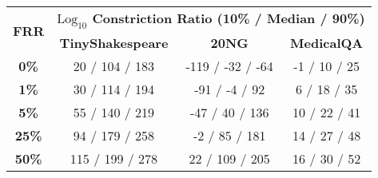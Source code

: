 \begin{tabular}{c c c c}
\toprule
\multirow{2}{*}{\textbf{FRR }} & \multicolumn{3}{c}{\textbf{$\text{Log}_{10}$ Constriction Ratio (10\% / Median / 90\%)}} \\
\cmidrule(lr){2-4}
 & \textbf{TinyShakespeare} & \textbf{20NG} & \textbf{MedicalQA} \\
\midrule
\textbf{0\%} & 20 / 104 / 183  & -119 / -32 / -64 & -1 / 10 / 25  \\
\textbf{1\%}  & 30 / 114 / 194  & -91 / -4 / 92 & 6 / 18 / 35 \\
\textbf{5\%}  & 55 / 140 / 219  & -47 / 40 / 136 & 10 / 22 / 41 \\
\textbf{25\%} & 94 / 179 / 258 & -2 / 85 / 181 & 14 / 27 / 48 \\
\textbf{50\%} & 115 / 199 / 278  & 22 / 109 / 205 & 16 / 30 / 52 \\
\bottomrule
\end{tabular}
